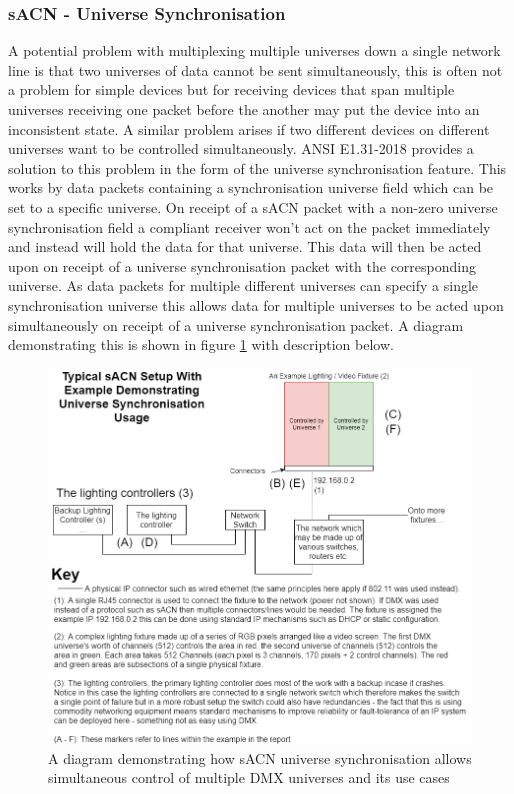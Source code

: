 \documentclass[11pt,a4paper]{article}
\begin{document}
\subsubsection{sACN - Universe Synchronisation}
A potential problem with multiplexing multiple universes down a single network line is that two universes of data cannot be sent simultaneously, this is often not a problem for simple devices but for receiving devices that span multiple universes receiving one packet before the another may put the device into an inconsistent state. A similar problem arises if two different devices on different universes want to be controlled simultaneously. ANSI E1.31-2018 provides a solution to this problem in the form of the universe synchronisation feature. This works by data packets containing a synchronisation universe field which can be set to a specific universe. On receipt of a sACN packet with a non-zero universe synchronisation field a compliant receiver won't act on the packet immediately and instead will hold the data for that universe. This data will then be acted upon on receipt of a universe synchronisation packet with the corresponding universe. As data packets for multiple different universes can specify a single synchronisation universe this allows data for multiple universes to be acted upon simultaneously on receipt of a universe synchronisation packet. A diagram demonstrating this is shown in figure \ref{UNI_SYNC_DESC} with description below.

\begin{figure}[H]
	\includegraphics[width=\textwidth]{sacn-uni-sync-example}
	\caption{A diagram demonstrating how sACN universe synchronisation allows simultaneous control of multiple DMX universes and its use cases}
	\label{UNI_SYNC_DESC}
\end{figure}
\end{document}
